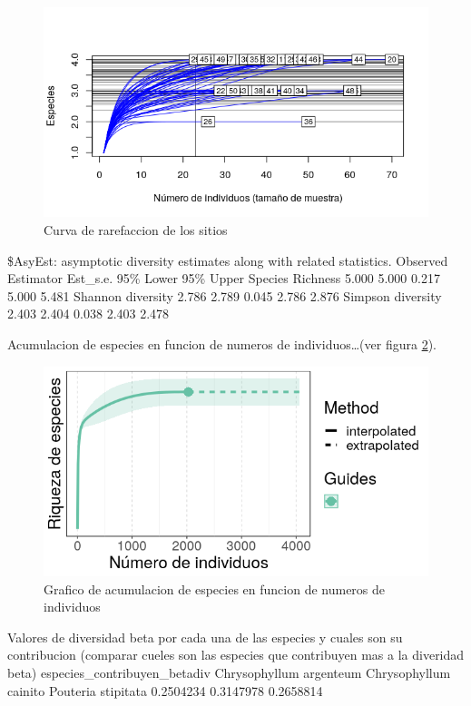 \documentclass[11pt,]{article}
\begin{document}
{{\begin{figure}
\centering
\includegraphics{Curva_rarefaccion.png}
\caption{Curva de rarefaccion de los sitios
\label{fig:Curva_rarefaccion}}
\end{figure}

\$AsyEst: asymptotic diversity estimates along with related statistics.
Observed Estimator Est\_s.e. 95\% Lower 95\% Upper Species Richness
5.000 5.000 0.217 5.000 5.481 Shannon diversity 2.786 2.789 0.045 2.786
2.876 Simpson diversity 2.403 2.404 0.038 2.403 2.478

Acumulacion de especies en funcion de numeros de individuos\ldots{}(ver
figura \ref{fig:acumulacion_especies_individuos}).

\begin{figure}
\centering
\includegraphics{acumulacion_especies_individuos.png}
\caption{Grafico de acumulacion de especies en funcion de numeros de
individuos \label{fig:acumulacion_especies_individuos}}
\end{figure}

Valores de diversidad beta por cada una de las especies y cuales son su
contribucion (comparar cueles son las especies que contribuyen mas a la
diveridad beta) especies\_contribuyen\_betadiv Chrysophyllum argenteum
Chrysophyllum cainito Pouteria stipitata 0.2504234 0.3147978 0.2658814

}}
\end{document}
